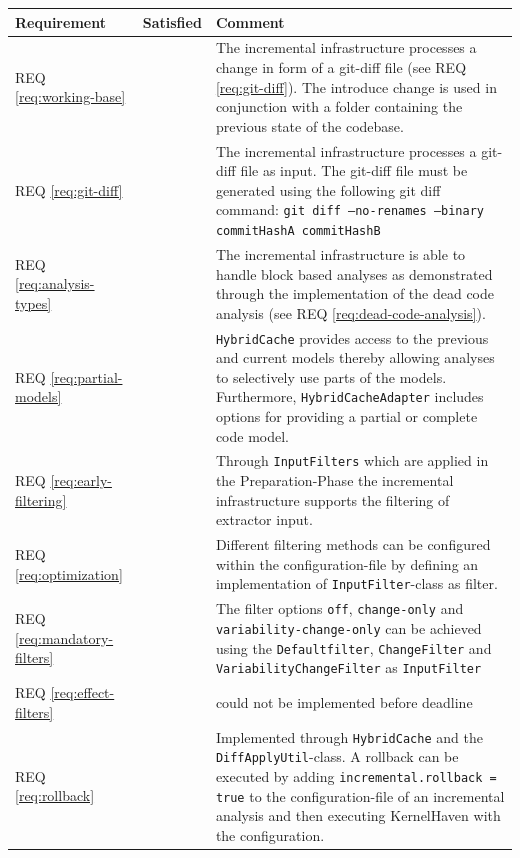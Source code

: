 \documentclass[a4paper]{article}
\newcommand{\cmark}{\ding{51}}%
\newcommand{\xmark}{\ding{55}}%
\begin{document}
\begin{longtable}{ |  L{0.19\textwidth} | C{0.125\textwidth} | L{0.60\textwidth} |}
	\hline
	\textbf{Requirement} & \textbf{Satisfied} & \textbf{Comment} \\
	\hline
	REQ \ref{req:working-base} & \cmark & The incremental infrastructure processes a change in form of a git-diff file (see REQ \ref{req:git-diff}). The introduce change is used in conjunction with a folder containing the previous state of the codebase. \\ \hline
	REQ \ref{req:git-diff} & \cmark & The incremental infrastructure processes a git-diff file as input. The git-diff file must be generated using the following git diff command: \texttt{git diff --no-renames --binary commitHashA commitHashB} \\ \hline
	REQ \ref{req:analysis-types} & \cmark & The incremental infrastructure is able to handle block based analyses as demonstrated through the implementation of the dead code analysis (see REQ \ref{req:dead-code-analysis}). \\ \hline
	REQ \ref{req:partial-models} & \cmark & \texttt{Hybrid\-Cache} provides access to the previous and current models thereby allowing analyses to selectively use parts of the models. Furthermore, \texttt{Hybrid\-Cache\-Adapter} includes options for providing a partial or complete code model. \\ \hline
	REQ \ref{req:early-filtering} & \cmark & Through \texttt{InputFilters} which are applied in the Preparation-Phase the incremental infrastructure supports the filtering of extractor input. \\ \hline
	REQ \ref{req:optimization} & \cmark &  Different filtering methods can be configured within the configuration-file by defining an implementation of \texttt{InputFilter}-class as filter. \\ \hline
	REQ \ref{req:mandatory-filters} & \cmark &  The filter options \texttt{off}, \texttt{change-only} and \texttt{variability-change-only} can be achieved using the \texttt{Defaultfilter}, \texttt{ChangeFilter} and \texttt{VariabilityChangeFilter} as  \texttt{InputFilter} \\ \hline
	REQ \ref{req:effect-filters} & \xmark &  could not be implemented before deadline\\ \hline
	REQ \ref{req:rollback} & \cmark & Implemented through \texttt{Hybrid\-Cache} and the \texttt{DiffApplyUtil}-class. A rollback can be executed by adding \texttt{incremental.rollback = true} to the configuration-file of an incremental analysis and then executing KernelHaven with the configuration. \\ \hline

\end{longtable}
\end{document}
